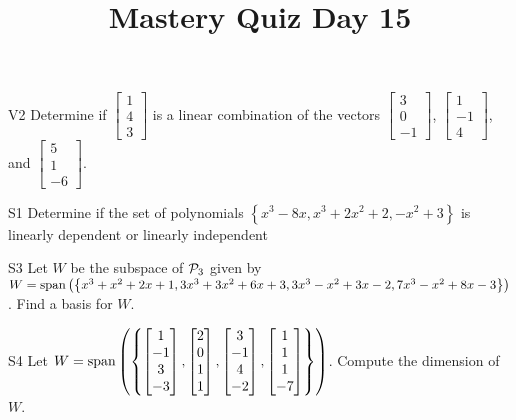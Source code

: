 \documentclass{sbgLAquiz}
\title{Mastery Quiz Day 15 }
\begin{document}
\begin{problem}{V2} Determine if $\begin{bmatrix} 1 \\ 4 \\ 3 \end{bmatrix}$ is a linear combination of the vectors $\begin{bmatrix} 3 \\ 0 \\ -1 \end{bmatrix}$, $\begin{bmatrix} 1 \\ -1 \\ 4 \end{bmatrix}$, and $\begin{bmatrix} 5 \\ 1 \\  -6 \end{bmatrix}$.
\end{problem}

\begin{problem}{S1}
Determine if the set of polynomials $\left\{ x^3-8x, x^3+2x^2+2, -x^2+3\right\}$ is  linearly dependent or linearly independent
\end{problem}
\newpage

\begin{problem}{S3}
Let $W$ be the subspace of $\P_3$ given by $W = {\rm span} \left( \left\{ x^3+x^2+2x+1, 3x^3+3x^2+6x+3, 3x^3-x^2+3x-2, 7x^3-x^2+8x-3 \right\} \right)$.  Find a basis for $W$.
\end{problem}

\begin{problem}{S4}
Let $W={\rm span}\left( \left\{ \begin{bmatrix} 1 \\ -1 \\ 3 \\ -3 \end{bmatrix},\begin{bmatrix} 2 \\ 0 \\ 1 \\ 1 \end{bmatrix}, \begin{bmatrix} 3 \\ -1 \\ 4 \\ -2 \end{bmatrix},  \begin{bmatrix} 1 \\ 1 \\ 1 \\ -7 \end{bmatrix} \right\}\right)$.  Compute the dimension of $W$.
\end{problem}
\end{document}
